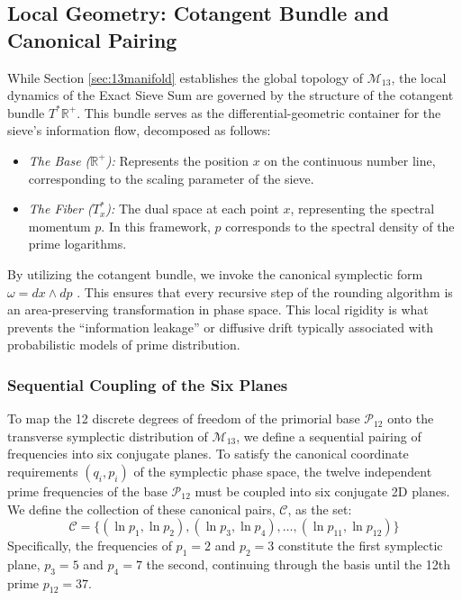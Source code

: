\documentclass[sn-mathphys-num, pdflatex]{sn-jnl}
\begin{document}
\subsection{Local Geometry: Cotangent Bundle and Canonical Pairing}
\label{sec:LocalGeometry}

While Section \ref{sec:13manifold} establishes the global topology of $\mathcal{M}_{13}$, the local dynamics of the Exact Sieve Sum are governed by the structure of the cotangent bundle $T^*\mathbb{R}^+$. This bundle serves as the differential-geometric container for the sieve's information flow, decomposed as follows:

\begin{itemize}
    \item \textit{The Base ($\mathbb{R}^+$):} Represents the position $x$ on the continuous number line, corresponding to the scaling parameter of the sieve.
    \item \textit{The Fiber ($T_x^*$):} The dual space at each point $x$, representing the spectral momentum $p$. In this framework, $p$ corresponds to the spectral density of the prime logarithms.
\end{itemize}

By utilizing the cotangent bundle, we invoke the canonical symplectic form $\omega = dx \wedge dp$ \cite{arnold1989}. This ensures that every recursive step of the rounding algorithm is an area-preserving transformation in phase space. This local rigidity is what prevents the ``information leakage'' or diffusive drift typically associated with probabilistic models of prime distribution. 

\subsubsection{Sequential Coupling of the Six Planes}
To map the 12 discrete degrees of freedom of the primorial base $\mathcal{P}_{12}$ onto the transverse symplectic distribution of $\mathcal{M}_{13}$, we define a sequential pairing of frequencies into six conjugate planes. To satisfy the canonical coordinate requirements $(q_i, p_i)$ of the symplectic phase space, the twelve independent prime frequencies of the base $\mathcal{P}_{12}$ must be coupled into six conjugate 2D planes. We define the collection of these canonical pairs, $\mathcal{C}$, as the set:
\begin{equation}
\mathcal{C} = \{ (\ln p_1, \ln p_2), (\ln p_3, \ln p_4), \dots, (\ln p_{11}, \ln p_{12}) \}
\end{equation}
Specifically, the frequencies of $p_1=2$ and $p_2=3$ constitute the first symplectic plane, $p_3=5$ and $p_4=7$ the second, continuing through the basis until the 12th prime $p_{12}=37$. 
\end{document}
